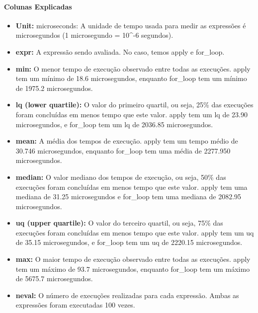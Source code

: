 \documentclass[
]{article}
\begin{document}
\paragraph{Colunas Explicadas}\label{colunas-explicadas}

\begin{itemize}
\item
  \textbf{Unit:} microseconds: A unidade de tempo usada para medir as
  expressões é microsegundos (1 microsegundo = 10\^{}-6 segundos).
\item
  \textbf{expr:} A expressão sendo avaliada. No caso, temos apply e
  for\_loop.
\item
  \textbf{min:} O menor tempo de execução observado entre todas as
  execuções. apply tem um mínimo de 18.6 microsegundos, enquanto
  for\_loop tem um mínimo de 1975.2 microsegundos.
\item
  \textbf{lq (lower quartile):} O valor do primeiro quartil, ou seja,
  25\% das execuções foram concluídas em menos tempo que este valor.
  apply tem um lq de 23.90 microsegundos, e for\_loop tem um lq de
  2036.85 microsegundos.
\item
  \textbf{mean:} A média dos tempos de execução. apply tem um tempo
  médio de 30.746 microsegundos, enquanto for\_loop tem uma média de
  2277.950 microsegundos.
\item
  \textbf{median:} O valor mediano dos tempos de execução, ou seja, 50\%
  das execuções foram concluídas em menos tempo que este valor. apply
  tem uma mediana de 31.25 microsegundos e for\_loop tem uma mediana de
  2082.95 microsegundos.
\item
  \textbf{uq (upper quartile):} O valor do terceiro quartil, ou seja,
  75\% das execuções foram concluídas em menos tempo que este valor.
  apply tem um uq de 35.15 microsegundos, e for\_loop tem um uq de
  2220.15 microsegundos.
\item
  \textbf{max:} O maior tempo de execução observado entre todas as
  execuções. apply tem um máximo de 93.7 microsegundos, enquanto
  for\_loop tem um máximo de 5675.7 microsegundos.
\item
  \textbf{neval:} O número de execuções realizadas para cada expressão.
  Ambas as expressões foram executadas 100 vezes.
\end{itemize}
\end{document}
